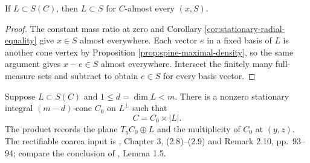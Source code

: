\begin{lemma}\label{lem:spine-tangent-directions}
If $L\subset S(C)$, then $L\subset S$ for $C$-almost every $(x,S)$.
\end{lemma}
\begin{proof}
The constant mass ratio at zero and Corollary \ref{cor:stationary-radial-equality} give $x\in S$ almost everywhere. Each vector $e$ in a fixed basis of $L$ is another cone vertex by Proposition \ref{prop:spine-maximal-density}, so the same argument gives $x-e\in S$ almost everywhere. Intersect the finitely many full-measure sets and subtract to obtain $e\in S$ for every basis vector.
\end{proof}

\begin{proposition}\label{prop:cone-product-splitting}
Suppose $L\subset S(C)$ and $1\leq d=\dim L<m$. There is a nonzero stationary integral $(m-d)$-cone $C_0$ on $L^\perp$ such that
\[
 C=C_0\times |L|.
\]
The product records the plane $T_yC_0\oplus L$ and the multiplicity of $C_0$ at $(y,z)$. The rectifiable coarea input is \cite{Sim18}, Chapter 3, (2.8)--(2.9) and Remark 2.10, pp.~93--94; compare the conclusion of \cite{Minter}, Lemma 1.5.
\end{proposition}
